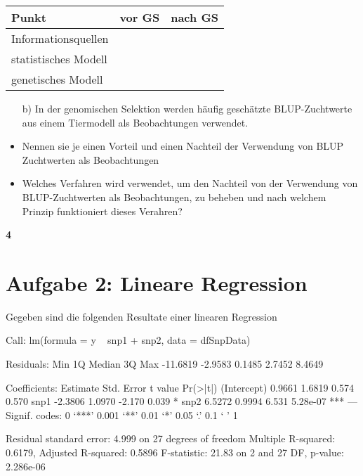 \documentclass{scrartcl}
\newcommand{\points}[1]
{\begin{flushright}\textbf{#1}\end{flushright}}
\begin{document}
\vspace{5ex}
\begin{tabular}{|l|p{6cm}|p{6cm}|}
\hline
Punkt  &  vor GS  &  nach GS \\
\hline
Informationsquellen   &
                      &  \vspace{20ex}\\
\hline
statistisches Modell  &
                      &  \vspace{25ex}\\
\hline
genetisches Modell    &
                      &  \vspace{25ex}\\
\hline
\end{tabular}

\clearpage
\pagebreak

\begin{enumerate}
\item[b)] In der genomischen Selektion werden h\"aufig gesch\"atzte BLUP-Zuchtwerte aus einem Tiermodell als Beobachtungen verwendet.
\end{enumerate}

\begin{itemize}
\item Nennen sie je einen Vorteil und einen Nachteil der Verwendung von BLUP Zuchtwerten als Beobachtungen \vspace{30ex}
\item Welches Verfahren wird verwendet, um den Nachteil von der Verwendung von BLUP-Zuchtwerten als Beobachtungen, zu beheben und nach welchem Prinzip funktioniert dieses Verahren?



\end{itemize}
\points{4}


\clearpage
\pagebreak

\section*{Aufgabe 2: Lineare Regression}
Gegeben sind die folgenden Resultate einer linearen Regression
\begin{Schunk}
\begin{Soutput}
Call:
lm(formula = y ~ snp1 + snp2, data = dfSnpData)

Residuals:
     Min       1Q   Median       3Q      Max 
-11.6819  -2.9583   0.1485   2.7452   8.4649 

Coefficients:
            Estimate Std. Error t value Pr(>|t|)    
(Intercept)   0.9661     1.6819   0.574    0.570    
snp1         -2.3806     1.0970  -2.170    0.039 *  
snp2          6.5272     0.9994   6.531 5.28e-07 ***
---
Signif. codes:  0 ‘***’ 0.001 ‘**’ 0.01 ‘*’ 0.05 ‘.’ 0.1 ‘ ’ 1

Residual standard error: 4.999 on 27 degrees of freedom
Multiple R-squared:  0.6179,	Adjusted R-squared:  0.5896 
F-statistic: 21.83 on 2 and 27 DF,  p-value: 2.286e-06
\end{Soutput}
\end{Schunk}
\end{document}
